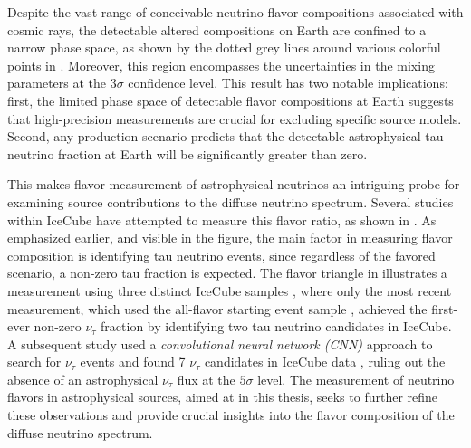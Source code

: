 Despite the vast range of conceivable neutrino flavor compositions associated with cosmic rays, the detectable altered compositions on Earth are confined to a narrow phase space, as shown by the dotted grey lines around various colorful points in . Moreover, this region encompasses the uncertainties in the mixing parameters at the $3\sigma$ confidence level. This result has two notable implications: first, the limited phase space of detectable flavor compositions at Earth suggests that high-precision measurements are crucial for excluding specific source models. Second, any production scenario predicts that the detectable astrophysical tau-neutrino fraction at Earth will be significantly greater than zero.

This makes flavor measurement of astrophysical neutrinos an intriguing probe for examining source contributions to the diffuse neutrino spectrum. Several studies within IceCube have attempted to measure this flavor ratio, as shown in . As emphasized earlier, and visible in the figure, the main factor in measuring flavor composition is identifying tau neutrino events, since regardless of the favored scenario, a non-zero tau fraction is expected. The flavor triangle in  illustrates a measurement using three distinct IceCube samples , where only the most recent measurement, which used the all-flavor starting event sample \cite{Juliana_paper}, achieved the first-ever non-zero $\nu_\tau$ fraction by identifying two tau neutrino candidates in IceCube. A subsequent study used a \emph{convolutional neural network (CNN)} approach to search for $\nu_\tau$ events and found 7 $\nu_\tau$ candidates in IceCube data , ruling out the absence of an astrophysical $\nu_\tau$ flux at the $5\sigma$ level. The measurement of neutrino flavors in astrophysical sources, aimed at in this thesis, seeks to further refine these observations and provide crucial insights into the flavor composition of the diffuse neutrino spectrum.


